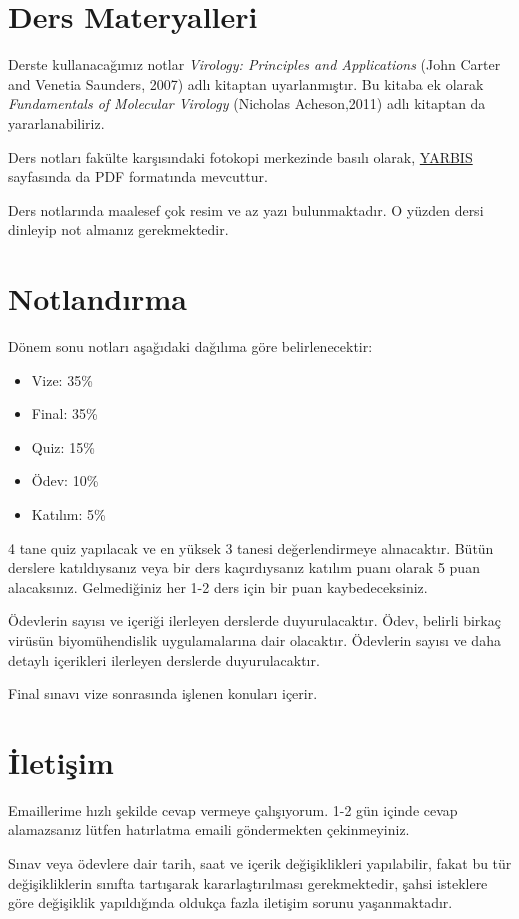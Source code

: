 \section{Ders Materyalleri}\label{ders-materyalleri}

Derste kullanacağımız notlar \emph{Virology: Principles and
Applications} (John Carter and Venetia Saunders, 2007) adlı kitaptan
uyarlanmıştır. Bu kitaba ek olarak \emph{Fundamentals of Molecular
Virology} (Nicholas Acheson,2011) adlı kitaptan da yararlanabiliriz.

Ders notları fakülte karşısındaki fotokopi merkezinde basılı olarak,
\href{http://yarbis.yildiz.edu.tr/alyilmaz/course/viewCourse/id/6392}{YARBIS}
sayfasında da PDF formatında mevcuttur.

Ders notlarında maalesef çok resim ve az yazı bulunmaktadır. O yüzden
dersi dinleyip not almanız gerekmektedir.

\section{Notlandırma}\label{notlandux131rma}

Dönem sonu notları aşağıdaki dağılıma göre belirlenecektir:

\begin{itemize}
\itemsep1pt\parskip0pt
\item
  Vize: 35\%
\item
  Final: 35\%
\item
  Quiz: 15\%
\item
  Ödev: 10\%
\item
  Katılım: 5\%
\end{itemize}

4 tane quiz yapılacak ve en yüksek 3 tanesi değerlendirmeye alınacaktır.
Bütün derslere katıldıysanız veya bir ders kaçırdıysanız katılım puanı
olarak 5 puan alacaksınız. Gelmediğiniz her 1-2 ders için bir puan
kaybedeceksiniz.

Ödevlerin sayısı ve içeriği ilerleyen derslerde duyurulacaktır. Ödev,
belirli birkaç virüsün biyomühendislik uygulamalarına dair olacaktır.
Ödevlerin sayısı ve daha detaylı içerikleri ilerleyen derslerde
duyurulacaktır.

Final sınavı vize sonrasında işlenen konuları içerir.

\section{İletişim}\label{iletiux15fim}

Emaillerime hızlı şekilde cevap vermeye çalışıyorum. 1-2 gün içinde
cevap alamazsanız lütfen hatırlatma emaili göndermekten çekinmeyiniz.

Sınav veya ödevlere dair tarih, saat ve içerik değişiklikleri
yapılabilir, fakat bu tür değişikliklerin sınıfta tartışarak
kararlaştırılması gerekmektedir, şahsi isteklere göre değişiklik
yapıldığında oldukça fazla iletişim sorunu yaşanmaktadır.
